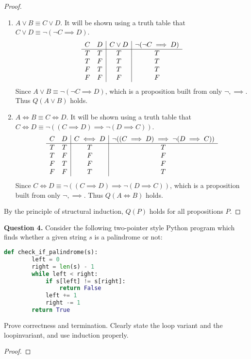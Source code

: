 \documentclass[11pt]{article}
\begin{document}
\begin{proof}
\begin{enumerate}
            \item \(A \lor B \equiv C \lor D\). It will be shown using a truth table that \(C \lor D \equiv \neg(\neg C\implies D)\).
            \begin{displaymath}
                \begin{array}{c c | c | c}
                    C & D & C \lor D & \neg(\neg C\implies D)\\
                    \hline
                    T & T & T & T\\
                    T & F & T & T\\
                    F & T & T & T\\
                    F & F & F & F\\
                \end{array}
            \end{displaymath}
            Since \(A \lor B \equiv \neg(\neg C\implies D)\), which is a proposition built from only \(\neg, \implies\). Thus \(Q(A \lor B)\) holds.

            \item \(A \iff B \equiv C \iff D\). It will be shown using a truth table that \(C \iff D \equiv \neg((C \implies D) \implies \neg(D \implies C))\).
            \begin{displaymath}
                \begin{array}{c c | c | c}
                    C & D & C \iff D & \neg((C \implies D) \implies \neg(D \implies C))\\
                    \hline
                    T & T & T & T\\
                    T & F & F & F\\
                    F & T & F & F\\
                    F & F & T & T\\
                \end{array}
            \end{displaymath}
            Since \(C \iff D \equiv \neg((C \implies D) \implies \neg(D \implies C))\), which is a proposition built from only \(\neg, \implies\). Thus \(Q(A \iff B)\) holds.
        \end{enumerate}
        By the principle of structural induction, \(Q(P)\) holds for all propositions \(P\).
        
    \end{proof}
    \pagebreak
    \noindent\textbf{Question 4.} Consider the following two-pointer style Python program which finds whether a given string $s$ is a palindrome or not:
    \begin{lstlisting}[language=Python]
    def check_if_palindrome(s):
        left = 0
        right = len(s) - 1
        while left < right:
            if s[left] != s[right]:
                return False
            left += 1
            right -= 1
        return True
    \end{lstlisting}
    Prove correctness and termination. Clearly state the loop variant and the loopinvariant, and use induction properly.
    
    \begin{proof}
        
    \end{proof}
\end{document}
